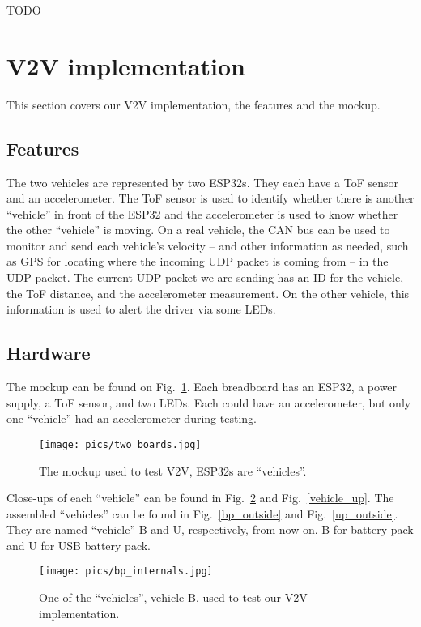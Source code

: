 \documentclass[conference]{IEEEtran}
\begin{document}
TODO

\section{V2V implementation}
This section covers our V2V implementation, the features and the mockup.

\subsection{Features}
The two vehicles are represented by two ESP32s. They each have a ToF sensor and
an accelerometer. The ToF sensor is used to identify whether there is another
``vehicle'' in front of the ESP32 and the accelerometer is used to know whether
the other ``vehicle'' is moving. On a real vehicle, the CAN bus can be used to
monitor and send each vehicle's velocity -- and other information as needed,
such as GPS for locating where the incoming UDP packet is coming from -- in the
UDP packet. The current UDP packet we are sending has an ID for the vehicle, the
ToF distance, and the accelerometer measurement. On the other vehicle, this
information is used to alert the driver via some LEDs.

\subsection{Hardware}
The mockup can be found on Fig.~\ref{mockup}. Each breadboard has an ESP32, a
power supply, a ToF sensor, and two LEDs. Each could have an accelerometer, but
only one ``vehicle'' had an accelerometer during testing.

\begin{figure}[htbp]
\centerline{\texttt{[image: pics/two\_boards.jpg]}}
\caption{The mockup used to test V2V, ESP32s are ``vehicles''.}
\label{mockup}
\end{figure}

Close-ups of each ``vehicle'' can be found in Fig.~\ref{vehicle_bp} and
Fig.~\ref{vehicle_up}. The assembled ``vehicles'' can be found in
Fig.~\ref{bp_outside} and Fig.~\ref{up_outside}. They are named ``vehicle'' B
and U, respectively, from now on. B for battery pack and U for USB battery pack.

\begin{figure}[htbp]
\centerline{\texttt{[image: pics/bp\_internals.jpg]}}
\caption{One of the ``vehicles'', vehicle B, used to test our V2V implementation.}
\label{vehicle_bp}
\end{figure}
\end{document}
